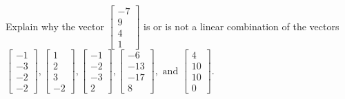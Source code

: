 \documentclass{article}
\begin{document}
\begin{exerciseStatement}
    Explain why the vector \(\left[\begin{array}{c}
-7 \\
9 \\
4 \\
1
\end{array}\right]\)  is or is not a linear
combination of the vectors \(\left[\begin{array}{c}
-1 \\
-3 \\
-2 \\
-2
\end{array}\right] , \left[\begin{array}{c}
1 \\
2 \\
3 \\
-2
\end{array}\right] , \left[\begin{array}{c}
-1 \\
-2 \\
-3 \\
2
\end{array}\right] , \left[\begin{array}{c}
-6 \\
-13 \\
-17 \\
8
\end{array}\right] , \text{ and } \left[\begin{array}{c}
4 \\
10 \\
10 \\
0
\end{array}\right]\).



  
\end{exerciseStatement}
\end{document}
